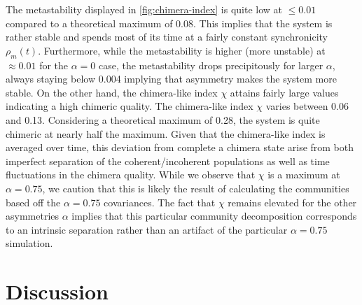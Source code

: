 \documentclass[pdflatex,lineno,referee,sn-mathphys-ay]{sn-jnl}
\begin{document}
The metastability displayed in \cref{fig:chimera-index}
is quite low at $\le \num{0.01}$ compared
to a theoretical maximum of \num{0.08}.
This implies that the system is rather stable
and spends most of its time at a fairly constant
synchronicity $\rho_m(t)$.
Furthermore, while the metastability is higher (more unstable)
at $\approx \num{0.01}$ for the $\alpha = 0$ case,
the metastability drops precipitously for larger $\alpha$,
always staying below \num{0.004} implying that
asymmetry makes the system more stable.
On the other hand, the chimera-like index $\chi$
attains fairly large values indicating a high chimeric quality.
The chimera-like index $\chi$ varies between \num{0.06} and \num{0.13}.
Considering a theoretical maximum of \num{0.28},
the system is quite chimeric at nearly half the maximum.
Given that the chimera-like index is averaged over time,
this deviation from complete a chimera state
arise from both imperfect separation of the coherent/incoherent populations
as well as time fluctuations in the chimera quality.
While we observe that $\chi$ is a maximum at $\alpha = \num{0.75}$,
we caution that this is likely the result of calculating the communities
based off the $\alpha = \num{0.75}$ covariances.
The fact that $\chi$ remains elevated for the other asymmetries $\alpha$
implies that this particular community decomposition
corresponds to an intrinsic separation rather than an artifact
of the particular $\alpha = \num{0.75}$ simulation.

\section{Discussion}
\label{sec:discussion}
\end{document}
